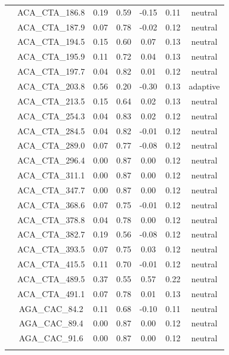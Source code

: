 \documentclass[11pt,]{article}
\begin{document}
\begin{longtable}[c]{@{}lcccccc@{}}
\\\addlinespace
& ACA\_CTA\_186.8 & 0.19 & 0.59 & -0.15 & 0.11 & neutral
\\\addlinespace
& ACA\_CTA\_187.9 & 0.07 & 0.78 & -0.02 & 0.12 & neutral
\\\addlinespace
& ACA\_CTA\_194.5 & 0.15 & 0.60 & 0.07 & 0.13 & neutral
\\\addlinespace
& ACA\_CTA\_195.9 & 0.11 & 0.72 & 0.04 & 0.13 & neutral
\\\addlinespace
& ACA\_CTA\_197.7 & 0.04 & 0.82 & 0.01 & 0.12 & neutral
\\\addlinespace
& ACA\_CTA\_203.8 & 0.56 & 0.20 & -0.30 & 0.13 & adaptive
\\\addlinespace
& ACA\_CTA\_213.5 & 0.15 & 0.64 & 0.02 & 0.13 & neutral
\\\addlinespace
& ACA\_CTA\_254.3 & 0.04 & 0.83 & 0.02 & 0.12 & neutral
\\\addlinespace
& ACA\_CTA\_284.5 & 0.04 & 0.82 & -0.01 & 0.12 & neutral
\\\addlinespace
& ACA\_CTA\_289.0 & 0.07 & 0.77 & -0.08 & 0.12 & neutral
\\\addlinespace
& ACA\_CTA\_296.4 & 0.00 & 0.87 & 0.00 & 0.12 & neutral
\\\addlinespace
& ACA\_CTA\_311.1 & 0.00 & 0.87 & 0.00 & 0.12 & neutral
\\\addlinespace
& ACA\_CTA\_347.7 & 0.00 & 0.87 & 0.00 & 0.12 & neutral
\\\addlinespace
& ACA\_CTA\_368.6 & 0.07 & 0.75 & -0.01 & 0.12 & neutral
\\\addlinespace
& ACA\_CTA\_378.8 & 0.04 & 0.78 & 0.00 & 0.12 & neutral
\\\addlinespace
& ACA\_CTA\_382.7 & 0.19 & 0.56 & -0.08 & 0.12 & neutral
\\\addlinespace
& ACA\_CTA\_393.5 & 0.07 & 0.75 & 0.03 & 0.12 & neutral
\\\addlinespace
& ACA\_CTA\_415.5 & 0.11 & 0.70 & -0.01 & 0.12 & neutral
\\\addlinespace
& ACA\_CTA\_489.5 & 0.37 & 0.55 & 0.57 & 0.22 & neutral
\\\addlinespace
& ACA\_CTA\_491.1 & 0.07 & 0.78 & 0.01 & 0.13 & neutral
\\\addlinespace
& AGA\_CAC\_84.2 & 0.11 & 0.68 & -0.10 & 0.11 & neutral
\\\addlinespace
& AGA\_CAC\_89.4 & 0.00 & 0.87 & 0.00 & 0.12 & neutral
\\\addlinespace
& AGA\_CAC\_91.6 & 0.00 & 0.87 & 0.00 & 0.12 & neutral
\\\addlinespace

\end{longtable}
\end{document}
